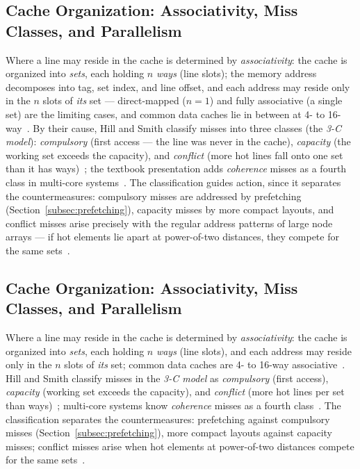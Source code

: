 \begin{nurlang}
\subsection{Cache Organization: Associativity, Miss Classes, and Parallelism}\label{subsec:cache-organisation}
Where a line may reside in the cache is determined by \emph{associativity}: the cache is organized
into \emph{sets}, each holding $n$ \emph{ways} (line slots); the memory address decomposes into tag,
set index, and line offset, and each address may reside only in the $n$ slots of \emph{its} set ---
direct-mapped ($n=1$) and fully associative (a single set) are the limiting cases, and common data
caches lie in between at 4- to
16-way~\cite{hennessy2019architecture,intel_optimization,amd_sog}. By their cause, Hill and Smith
classify misses into three classes (the \emph{3-C model}): \emph{compulsory} (first access --- the
line was never in the cache), \emph{capacity} (the working set exceeds the capacity), and
\emph{conflict} (more hot lines fall onto one set than it has ways)~\cite{hill1989associativity};
the textbook presentation adds \emph{coherence} misses as a fourth class in multi-core
systems~\cite{hennessy2019architecture}. The classification guides action, since it
separates the countermeasures: compulsory misses are addressed by prefetching
(Section~\ref{subsec:prefetching}), capacity misses by more compact layouts, and conflict misses
arise precisely with the regular address patterns of large node arrays --- if hot elements lie
apart at power-of-two distances, they compete for the same
sets~\cite{hennessy2019architecture,drepper2007memory}.
\end{nurlang}
\begin{nurkurz}
\subsection{Cache Organization: Associativity, Miss Classes, and Parallelism}\label{subsec:cache-organisation}
Where a line may reside in the cache is determined by \emph{associativity}: the cache is organized into
\emph{sets}, each holding $n$ \emph{ways} (line slots), and each address may reside only in the $n$ slots of
\emph{its} set; common data caches are 4- to 16-way
associative~\cite{hennessy2019architecture,intel_optimization,amd_sog}. Hill and Smith classify misses in the
\emph{3-C model} as \emph{compulsory} (first access), \emph{capacity} (working set exceeds the capacity), and
\emph{conflict} (more hot lines per set than ways)~\cite{hill1989associativity}; multi-core systems know
\emph{coherence} misses as a fourth class~\cite{hennessy2019architecture}. The classification separates the
countermeasures: prefetching against compulsory misses (Section~\ref{subsec:prefetching}), more compact
layouts against capacity misses; conflict misses arise when hot elements at power-of-two distances compete for
the same sets~\cite{hennessy2019architecture,drepper2007memory}.
\end{nurkurz}


